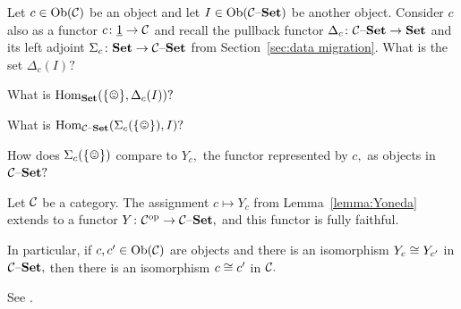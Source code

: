 \documentclass[CT4S-EN-RU]{subfiles}
\begin{document}
\begin{exampleRUS}\label{ex:yoneda for cyclic monoid}
\end{exampleRUS}

\begin{exerciseENG}
Let $c\in\operatorname{Ob}(\mathcal{C})$ be an object and let $I\in\operatorname{Ob}(\mathcal{C}{\text \textendash}{\mathbf{Set}})$ be another object. Consider $c$ also as a functor $c\colon\underline{1}\rightarrow\mathcal{C}$ and recall the pullback functor $\Delta_c\colon\mathcal{C}{\text \textendash}{\mathbf{Set}}\rightarrow{\mathbf{Set}}$ and its left adjoint $\Sigma_c\colon{\mathbf{Set}}\rightarrow\mathcal{C}{\text \textendash}{\mathbf{Set}}$ from Section~\ref{sec:data migration}.
\sexc What is the set $\Delta_c(I)?$
\item What is $\Hom_\Set(\singleton,\Delta_c(I))?$
\item What is $\Hom_{\mcC\set}(\Sigma_c(\singleton),I)?$
\item How does $\Sigma_c(\singleton)$ compare to $Y_c,$ the functor represented by $c,$ as objects in $\mathcal{C}{\text \textendash}{\mathbf{Set}}?$
\endsexc
\end{exerciseENG}

\begin{exerciseRUS}
\end{exerciseRUS}

\begin{lemmaENG}
Let $\mathcal{C}$ be a category. The assignment $c\mapsto Y_c$ from Lemma~\ref{lemma:Yoneda} extends to a functor $Y\colon\mathcal{C}^\textnormal{op}\rightarrow\mathcal{C}{\text \textendash}{\mathbf{Set}},$ and this functor is fully faithful. 

In particular, if $c,c'\in\operatorname{Ob}(\mathcal{C})$ are objects and there is an isomorphism $Y_c\cong Y_{c'}$ in $\mathcal{C}{\text \textendash}{\mathbf{Set}},$ then there is an isomorphism $c\cong c'$ in $\mathcal{C}.$
\end{lemmaENG}

\begin{lemmaRUS}
\end{lemmaRUS}

\begin{proofENG}
See \cite{Mac}.
\end{proofENG}

\begin{proofRUS}
\end{proofRUS}
\end{document}
